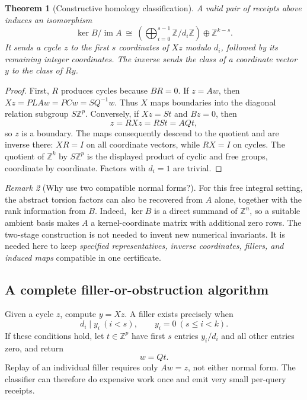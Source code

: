 \documentclass[11pt,letterpaper]{article}
\newtheorem{theorem}{Theorem}[section]
\theoremstyle{definition}\newtheorem{definition}[theorem]{Definition}
\theoremstyle{remark}\newtheorem{remark}[theorem]{Remark}
\newcommand{\Z}{\mathbb Z}\newcommand{\Q}{\mathbb Q}
\newcommand{\im}{\operatorname{im}}\newcommand{\rank}{\operatorname{rank}}
\begin{document}
\begin{theorem}[Constructive homology classification]\label{thm:classification}
A valid pair of receipts above induces an isomorphism
\[
 \ker B/\im A\ \cong\
 \left(\bigoplus_{i=0}^{s-1}\Z/d_i\Z\right)\oplus\Z^{k-s}.
\]
It sends a cycle $z$ to the first $s$ coordinates of $Xz$ modulo $d_i$, followed
by its remaining integer coordinates. The inverse sends the class of a
coordinate vector $y$ to the class of $Ry$.
\end{theorem}
\begin{proof}
First, $R$ produces cycles because $BR=0$. If $z=Aw$, then
$Xz=PLA w=PCw=SQ^{-1}w$. Thus $X$ maps boundaries into the diagonal relation
subgroup $S\Z^p$. Conversely, if $Xz=St$ and $Bz=0$, then
\[
 z=RXz=RSt=AQt,
\]
so $z$ is a boundary. The maps consequently descend to the quotient and are
inverse there: $XR=I$ on all coordinate vectors, while $RX=I$ on cycles. The
quotient of $\Z^k$ by $S\Z^p$ is the displayed product of cyclic and free groups,
coordinate by coordinate. Factors with $d_i=1$ are trivial.
\end{proof}

\begin{remark}[Why use two compatible normal forms?]
For this free integral setting, the abstract torsion factors can also be
recovered from $A$ alone, together with the rank information from $B$.
Indeed, $\ker B$ is a direct summand of $\Z^n$, so a suitable ambient basis
makes $A$ a kernel-coordinate matrix with additional zero rows. The two-stage
construction is not needed to invent new numerical invariants. It is needed
here to keep \emph{specified representatives, inverse coordinates, fillers,
and induced maps} compatible in one certificate.
\end{remark}

\subsection{A complete filler-or-obstruction algorithm}
Given a cycle $z$, compute $y=Xz$. A filler exists precisely when
\begin{equation}\label{eq:filling-test}
 d_i\mid y_i\ (i<s),\qquad y_i=0\ (s\leq i<k).
\end{equation}
If these conditions hold, let $t\in\Z^p$ have first $s$ entries $y_i/d_i$ and
all other entries zero, and return
\begin{equation}\label{eq:filler}
 w=Qt.
\end{equation}
Replay of an individual filler requires only $Aw=z$, not either normal form.
The classifier can therefore do expensive work once and emit very small
per-query receipts.
\end{document}
